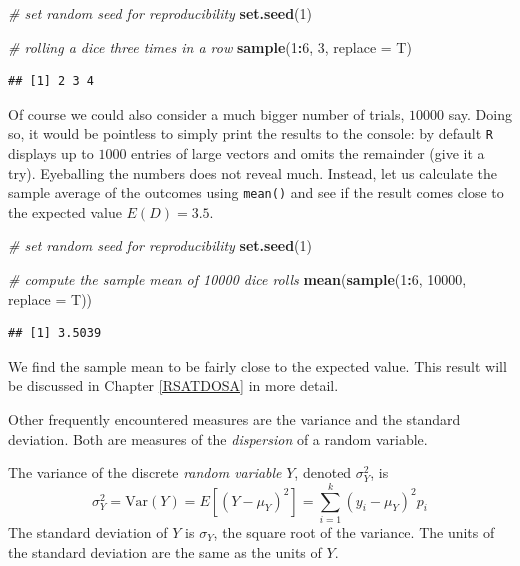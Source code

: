 \documentclass[]{book}
\newenvironment{Shaded}{\begin{snugshade}}{\end{snugshade}}
\newcommand{\KeywordTok}[1]{\textcolor[rgb]{0.13,0.29,0.53}{\textbf{#1}}}
\newcommand{\DataTypeTok}[1]{\textcolor[rgb]{0.13,0.29,0.53}{#1}}
\newcommand{\DecValTok}[1]{\textcolor[rgb]{0.00,0.00,0.81}{#1}}
\newcommand{\CommentTok}[1]{\textcolor[rgb]{0.56,0.35,0.01}{\textit{#1}}}
\newcommand{\OperatorTok}[1]{\textcolor[rgb]{0.81,0.36,0.00}{\textbf{#1}}}
\newcommand{\NormalTok}[1]{#1}
\theoremstyle{definition}
\theoremstyle{definition}
\theoremstyle{definition}
\theoremstyle{remark}
\begin{document}
\begin{Shaded}
\begin{Highlighting}[]
\CommentTok{# set random seed for reproducibility}
\KeywordTok{set.seed}\NormalTok{(}\DecValTok{1}\NormalTok{)}

\CommentTok{# rolling a dice three times in a row}
\KeywordTok{sample}\NormalTok{(}\DecValTok{1}\OperatorTok{:}\DecValTok{6}\NormalTok{, }\DecValTok{3}\NormalTok{, }\DataTypeTok{replace =}\NormalTok{ T)}
\end{Highlighting}
\end{Shaded}

\begin{verbatim}
## [1] 2 3 4
\end{verbatim}

Of course we could also consider a much bigger number of trials,
\(10000\) say. Doing so, it would be pointless to simply print the
results to the console: by default \texttt{R} displays up to \(1000\)
entries of large vectors and omits the remainder (give it a try).
Eyeballing the numbers does not reveal much. Instead, let us calculate
the sample average of the outcomes using \texttt{mean()} and see if the
result comes close to the expected value \(E(D)=3.5\).

\begin{Shaded}
\begin{Highlighting}[]
\CommentTok{# set random seed for reproducibility}
\KeywordTok{set.seed}\NormalTok{(}\DecValTok{1}\NormalTok{)}

\CommentTok{# compute the sample mean of 10000 dice rolls}
\KeywordTok{mean}\NormalTok{(}\KeywordTok{sample}\NormalTok{(}\DecValTok{1}\OperatorTok{:}\DecValTok{6}\NormalTok{, }
           \DecValTok{10000}\NormalTok{, }
           \DataTypeTok{replace =}\NormalTok{ T))}
\end{Highlighting}
\end{Shaded}

\begin{verbatim}
## [1] 3.5039
\end{verbatim}

We find the sample mean to be fairly close to the expected value. This
result will be discussed in Chapter \ref{RSATDOSA} in more detail.

Other frequently encountered measures are the variance and the standard
deviation. Both are measures of the \emph{dispersion} of a random
variable.

\begin{keyconcepts}{2.2}
The variance of the discrete \textit{random variable} $Y$, denoted $\sigma^2_Y$, is
$$ \sigma^2_Y = \text{Var}(Y) = E\left[(Y-\mu_Y)^2\right] = \sum_{i=1}^k (y_i - \mu_Y)^2 p_i $$
The standard deviation of $Y$ is $\sigma_Y$, the square root of the variance. The units of the standard deviation are the same as the units of $Y$.
\end{keyconcepts}
\end{document}
